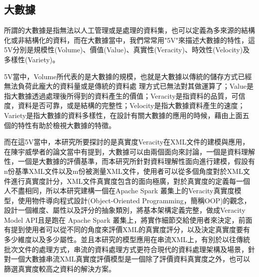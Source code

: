 \subsection{大數據}
所謂的大數據\cite{bigdata}是指無法以人工管理或是處理的資料集，也可以定義為多來源的結構化或非結構化的資料，而在大數據當中，我們常常用"5V"來描述大數據的特性，這5V分別是規模性(Volume)、價值(Value)、真實性(Veracity)、時效性(Velocity)及多樣性(Variety)。\\\par
5V當中，Volume所代表的是大數據的規模，也就是大數據以傳統的儲存方式已經無法負荷此龐大的資料量或是傳統的資料處 理方式已無法對其做運算了；Value是指大數據透過處理後所得到的資料產生的價值；Veracity是指資料的品質，可信度，資料是否可靠，或是結構的完整性；Velocity是指大數據資料產生的速度；Variety是指大數據的資料多樣性，在設計有關大數據的應用的時候，藉由上面五個的特性有助於檢視大數據的特徵。\\\par
而在這5V當中，本研究所要探討的是真實度Veracity在XML文件的建模與應用，在陳宇威學者的論文\cite{veracitymodel}當中有提到，大數據可以由兩個面向來討論，一個是資料理解性，一個是大數據的評價基準，而本研究所針對資料理解性面向進行建模，假設有n份基準XML文件以及m份被測量XML文件，使用者可以從多個角度對於XML文件進行真實度計分，XML文件真實度包含的面向極廣，對於真實度的定義每一個人不盡相同，所以本研究建構一個在Apache Spark 叢集上的Veracity真實度模型，使用物件導向程式設計(Object-Oriented Programming，簡稱OOP)的觀念，設計一個維度、屬性以及評分的抽象類別，將基本架構定義完整，做成Veracity Model API且是跑在 Apache Spark 叢集上，將實作細節交給使用者來決定，前面有提到使用者可以從不同的角度來評價XML的真實度評分，以及決定真實度要有多少維度以及多少屬性。並且本研究的模型應用在串流XML上，有別於以往傳統批次文件的處理方式，串流的資料處理方式更符合現代的資料處理架構及場景，針對一個大數據串流XML真實度評價模型是一個除了評價資料真實度之外，也可以篩選真實度較高之資料的解決方案。
